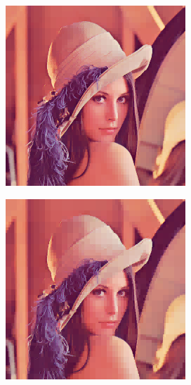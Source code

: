 \documentclass[11pt]{report}
\theoremstyle{plain}
\theoremstyle{remark}
\begin{document}
\begin{figure}
	\centering
	\begin{subfigure}[b]{0.24\textwidth}
		\centering
		\includegraphics[width=\textwidth]{plaatjes/Lenna_haar_0_1.png}
	\end{subfigure}
	\begin{subfigure}[b]{0.24\textwidth}
		\centering
		\includegraphics[width=\textwidth]{plaatjes/Lenna_haar_0_05.png}

\end{subfigure}
\end{figure}
\end{document}
